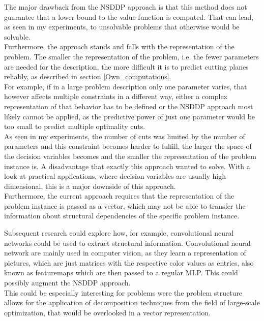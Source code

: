 The major drawback from the NSDDP approach is that this method does not guarantee that a lower bound to the value function is computed.
That can lead, as seen in my experiments, to unsolvable problems that otherwise would be solvable.  \\
Furthermore, the approach stands and falls with the representation of the problem.
The smaller the representation of the problem, i.e. the fewer parameters are needed for the description, the more difficult it is to predict cutting planes reliably, as described in section \ref{Own_computations}.  \\
For example, if in a large problem description only one parameter varies, that however affects multiple constraints in a different way, either a complex representation of that behavior has to be defined or the NSDDP approach most likely cannot be applied, as the predictive power of just one parameter would be too small to predict multiple optimality cuts. \\
As seen in my experiments, the number of cuts was limited by the number of parameters and this constraint becomes harder to fulfill, the larger the space of the decision variables becomes and the smaller the representation of the problem instance is.
A disadvantage that exactly this approach wanted to solve.
With a look at practical applications, where decision variables are usually high-dimensional, this is a major downside of this approach. \\
Furthermore, the current approach requires that the representation of the problem instance is passed as a vector, which may not be able to transfer the information about structural dependencies of the specific problem instance.

Subsequent research could explore how, for example, convolutional neural networks could be used to extract structural information.
Convolutional neural network are mainly used in computer vision, as they learn a representation of pictures, which are just matrices with the respective color values as entries, also known as featuremaps \cite{ComputerVisionBook} which are then passed to a regular MLP.
This could possibly augment the NSDDP approach. \\
This could be especially interesting for problems were the problem structure allows for the application of decomposition techniques from the field of large-scale optimization, that would be overlooked in a vector representation.

